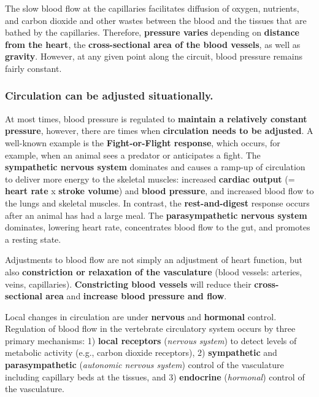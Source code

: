 \documentclass[
  letterpaper,
  DIV=11,
  numbers=noendperiod,
  oneside]{scrartcl}
\begin{document}
The slow blood flow at the capillaries facilitates diffusion of oxygen,
nutrients, and carbon dioxide and other wastes between the blood and the
tissues that are bathed by the capillaries. Therefore, \textbf{pressure
varies} depending on \textbf{distance from the heart}, the
\textbf{cross-sectional area of the blood vessels}, as well as
\textbf{gravity}. However, at any given point along the circuit, blood
pressure remains fairly constant.

\hypertarget{circulation-can-be-adjusted-situationally.}{%
\subsubsection{Circulation can be adjusted
situationally.}\label{circulation-can-be-adjusted-situationally.}}

At most times, blood pressure is regulated to \textbf{maintain a
relatively constant pressure}, however, there are times when
\textbf{circulation needs to be adjusted}. A well-known example is the
\textbf{Fight-or-Flight response}, which occurs, for example, when an
animal sees a predator or anticipates a fight. The \textbf{sympathetic
nervous system} dominates and causes a ramp-up of circulation to deliver
more energy to the skeletal muscles: increased \textbf{cardiac output}
(= \textbf{heart rate} x \textbf{stroke volume}) and \textbf{blood
pressure}, and increased blood flow to the lungs and skeletal muscles.
In contrast, the \textbf{rest-and-digest} response occurs after an
animal has had a large meal. The \textbf{parasympathetic nervous system}
dominates, lowering heart rate, concentrates blood flow to the gut, and
promotes a resting state.

Adjustments to blood flow are not simply an adjustment of heart
function, but also \textbf{constriction or relaxation of the
vasculature} (blood vessels: arteries, veins, capillaries).
\textbf{Constricting blood vessels} will reduce their
\textbf{cross-sectional area} and \textbf{increase blood pressure and
flow}.

Local changes in circulation are under \textbf{nervous} and
\textbf{hormonal} control. Regulation of blood flow in the vertebrate
circulatory system occurs by three primary mechanisms: 1) \textbf{local
receptors} (\emph{nervous system}) to detect levels of metabolic
activity (e.g., carbon dioxide receptors), 2) \textbf{sympathetic} and
\textbf{parasympathetic} (\emph{autonomic nervous system}) control of
the vasculature including capillary beds at the tissues, and 3)
\textbf{endocrine} (\emph{hormonal}) control of the vasculature.
\end{document}
